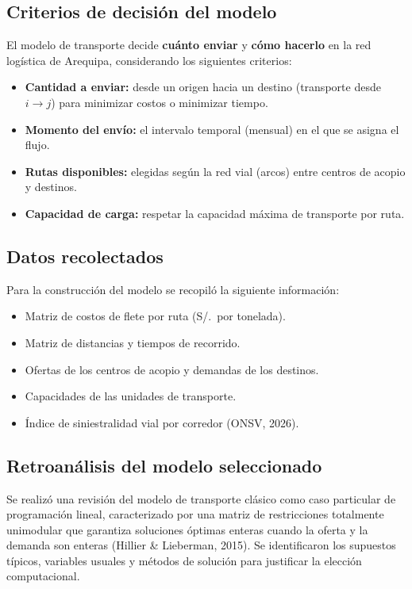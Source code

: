 \documentclass[11pt,a4paper]{article}
\begin{document}
\subsection{Criterios de decisi\'on del modelo}
El modelo de transporte decide \textbf{cu\'anto enviar} y \textbf{c\'omo hacerlo} en la red log\'istica de Arequipa, considerando los siguientes criterios:
\begin{itemize}
  \item \textbf{Cantidad a enviar:} desde un origen hacia un destino (transporte desde $i \to j$) para minimizar costos o minimizar tiempo.
  \item \textbf{Momento del env\'io:} el intervalo temporal (mensual) en el que se asigna el flujo.
  \item \textbf{Rutas disponibles:} elegidas seg\'un la red vial (arcos) entre centros de acopio y destinos.
  \item \textbf{Capacidad de carga:} respetar la capacidad m\'axima de transporte por ruta.
\end{itemize}

\subsection{Datos recolectados}
Para la construcci\'on del modelo se recopil\'o la siguiente informaci\'on:
\begin{itemize}
  \item Matriz de costos de flete por ruta (S/.\ por tonelada).
  \item Matriz de distancias y tiempos de recorrido.
  \item Ofertas de los centros de acopio y demandas de los destinos.
  \item Capacidades de las unidades de transporte.
  \item \'Indice de siniestralidad vial por corredor (ONSV, 2026).
\end{itemize}

\subsection{Retroan\'alisis del modelo seleccionado}
Se realiz\'o una revisi\'on del modelo de transporte cl\'asico como caso particular de programaci\'on lineal, caracterizado por una matriz de restricciones totalmente unimodular que garantiza soluciones \'optimas enteras cuando la oferta y la demanda son enteras (Hillier \& Lieberman, 2015). Se identificaron los supuestos t\'ipicos, variables usuales y m\'etodos de soluci\'on para justificar la elecci\'on computacional.
\end{document}
